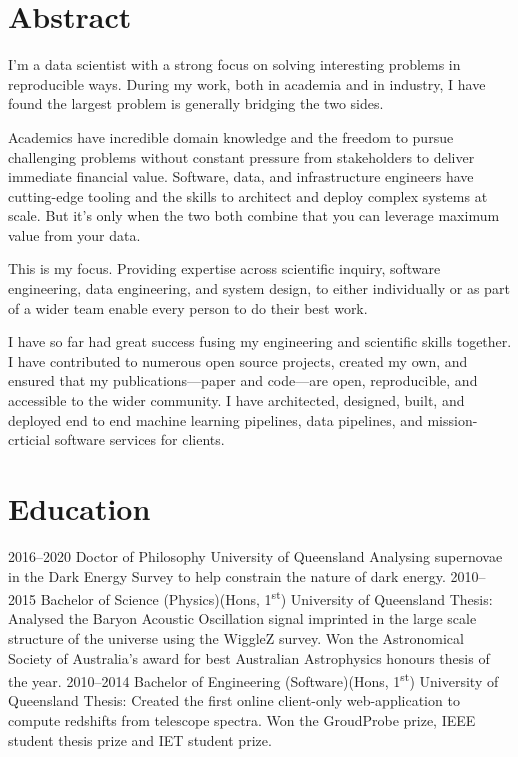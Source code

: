 
\section{Abstract}

I'm a data scientist with a strong focus on solving interesting problems in reproducible ways. During my
work, both in academia and in industry, I have found the largest problem is generally bridging the two sides.

Academics have incredible domain knowledge and the freedom to pursue challenging problems without constant
pressure from stakeholders to deliver immediate financial value. Software, data, and infrastructure
engineers have cutting-edge tooling and the skills to architect and deploy complex systems at scale. But it's only
when the two both combine that you can leverage maximum value from your data.

This is my focus. Providing expertise across scientific inquiry, software engineering, data engineering, and
system design, to either individually or as part of a wider team enable every person to do their best work.

I have so far had great success fusing my engineering and scientific skills together. I have contributed to
numerous open source projects, created my own, and ensured that my publications---paper and code---are
open, reproducible, and accessible to the wider community. I have architected, designed, built, and deployed
end to end machine learning pipelines, data pipelines, and mission-crticial software services for clients.


\section{Education}

\begin{entrylist}
\entry
{2016--2020}
{Doctor of Philosophy}
{University of Queensland}
{Analysing supernovae in the Dark Energy Survey to help constrain the nature of dark energy.}
\entry
{2010--2015}
{Bachelor of Science {\normalfont (Physics)(Hons, 1\textsuperscript{st})}}
{University of Queensland}
{Thesis: Analysed the Baryon Acoustic Oscillation signal imprinted in the large scale structure of the universe using the WiggleZ survey. Won the Astronomical Society of Australia's award for best Australian Astrophysics honours thesis of the year.}
\entry
{2010--2014}
{Bachelor of Engineering {\normalfont (Software)(Hons, 1\textsuperscript{st})}}
{University of Queensland}
{Thesis: Created the first online client-only web-application to compute redshifts from telescope spectra. Won the GroudProbe prize, IEEE student thesis prize and IET student prize.}

\end{entrylist}

